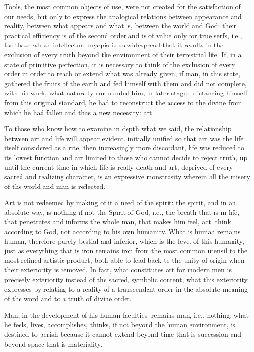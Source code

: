 Tools, the most common objects of use, were not created for the satisfaction of our needs, but only to express the analogical relations between appearance and reality, between what appears and what is, between the world and God: their practical efficiency is of the second order and is of value only for true serfs, i.e., for those whose intellectual myopia is so widespread that it results in the exclusion of every truth beyond the environment of their terrestrial life. If, in a state of primitive perfection, it is necessary to think of the exclusion of every order in order to reach or extend what was already given, if man, in this state, gathered the fruits of the earth and fed himself with them and did not complete, with his work, what naturally surrounded him, in later stages, distancing himself from this original standard, he had to reconstruct the access to the divine from which he had fallen and thus a new necessity: art.

To those who know how to examine in depth what we said, the relationship between art and life will appear evident, initially unified so that art was the life itself considered as a rite, then increasingly more discordant, life was reduced to its lowest function and art limited to those who cannot decide to reject truth, up until the current time in which life is really death and art, deprived of every sacred and realizing character, is an expressive monstrosity wherein all the misery of the world and man is reflected.

Art is not redeemed by making of it a need of the spirit: the spirit, and in an absolute way, is nothing if not the Spirit of God, i.e., the breath that is in life, that penetrates and informs the whole man, that makes him feel, act, think according to God, not according to his own humanity. What is human remains human, therefore purely bestial and inferior, which is the level of this humanity, just as everything that is iron remains iron from the most common utensil to the most refined artistic product, both able to lead back to the unity of origin when their exteriority is removed. In fact, what constitutes art for modern men is precisely exteriority instead of the sacred, symbolic content, what this exteriority expresses by relating to a reality of a transcendent order in the absolute meaning of the word and to a truth of divine order.

Man, in the development of his human faculties, remains man, i.e., nothing: what he feels, lives, accomplishes, thinks, if not beyond the human environment, is destined to perish because it cannot extend beyond time that is succession and beyond space that is materiality.

